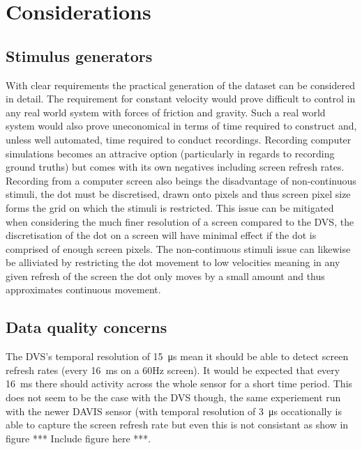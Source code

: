 \section{Considerations}
\subsection{Stimulus generators}
With clear requirements the practical generation of the dataset can be considered in detail.
The requirement for constant velocity would prove difficult to control in any real world system with forces of friction and gravity.
Such a real world system would also prove uneconomical in terms of time required to construct and, unless well automated, time required to conduct recordings. 
Recording computer simulations becomes an attracive option (particularly in regards to recording ground truths) but comes with its own negatives including screen refresh rates.
Recording from a computer screen also beings the disadvantage of non-continuous stimuli, the dot must be discretised, drawn onto pixels and thus screen pixel size forms the grid on which the stimuli is restricted. 
This issue can be mitigated when considering the much finer resolution of a screen compared to the DVS, the discretisation of the dot on a screen will have minimal effect if the dot is comprised of enough screen pixels.
The non-continuous stimuli issue can likewise be alliviated by restricting the dot movement to low velocities meaning in any given refresh of the screen the dot only moves by a small amount and thus approximates continuous movement. 


\subsection{Data quality concerns}

The DVS's temporal resolution of \SI{15}{\micro\second} mean it should be able to detect screen refresh rates (every \SI{16}{\milli\second} on a 60Hz screen). 
It would be expected that every \SI{16}{\milli\second} there should activity across the whole sensor for a short time period. 
This does not seem to be the case with the DVS though, the same experiement run with the newer DAVIS sensor (with temporal resolution of \SI{3}{\micro\second} occationally is able to capture the screen refresh rate but even this is not consistant as show in figure *** Include figure here ***.

